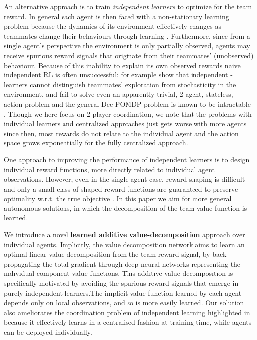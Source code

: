 \documentclass{article}
\begin{document}
An alternative approach is to train \emph{independent learners} to optimize for the team reward. In general each agent is then faced with a non-stationary learning problem because the dynamics of its environment effectively changes as teammates change their behaviours through learning \citep{Laurent11}. Furthermore, since from a single agent's perspective the environment is only partially observed, agents may receive spurious reward signals that originate from their teammates' (unobserved) behaviour. Because of this inability to explain its own observed rewards naive independent RL is often unsuccessful: for example \citet{ClausBoutillierDynamics} show that independent -learners cannot distinguish teammates' exploration from stochasticity in the environment, and fail to solve even an apparently trivial, 2-agent, stateless, -action problem and the general Dec-POMDP problem is known to be intractable \citep{BernsteinDecPomdp,OliehoekAmato16book}. Though we here focus on 2 player coordination, we note that the problems with individual learners and centralized approaches just gets worse with more agents since then, most rewards do not relate to the individual agent and the action space grows exponentially for the fully centralized approach.

One approach to improving the performance of independent learners is to design individual reward functions, more directly related to individual agent observations. However, even in the single-agent case, reward shaping is difficult and only a small class of shaped reward functions are guaranteed to preserve optimality w.r.t. the true objective \citep{NgShaping,tumer-devlin_aamas14,EckSDK16}. In this paper we aim for more general autonomous solutions, in which the decomposition of the team value function is learned.



We introduce a novel {\bf learned additive value-decomposition} approach over individual agents. Implicitly, the value decomposition network aims to learn an optimal linear value decomposition from the team reward signal, by back-propagating the total  gradient through deep neural networks representing the individual component value functions. This additive value decomposition is specifically motivated by avoiding the spurious reward signals that emerge in purely independent learners.The implicit value function learned by each agent depends only on local observations, and so is more easily learned. Our solution also ameliorates the coordination problem of independent learning highlighted in \citet{ClausBoutillierDynamics} because it effectively learns in a centralised fashion at training time, while agents can be deployed individually. 
\end{document}
